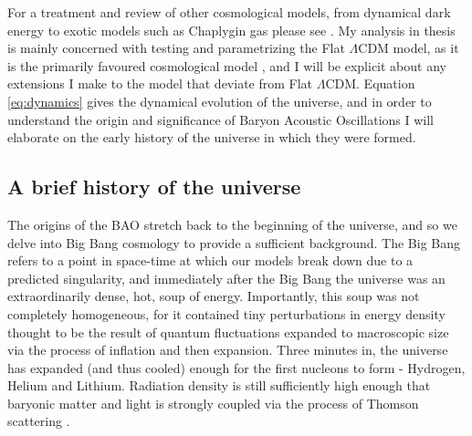 \documentclass[titlesmallcaps, examinerscopy, copyrightpage]{uqthesis}
\begin{document}
For a treatment and review of other cosmological models, from dynamical dark energy \citep{PeeblesRatra1988} to exotic models such as Chaplygin gas \citep{BentoBertolami2003, Benaoum2012} please see \citet{PeeblesRatra2003,DavisMortsell2007, FriemanTurnerHuterer2008, GottSlepian2011}. My analysis in thesis is mainly concerned with testing and parametrizing the Flat $\Lambda$CDM model, as it is the primarily favoured cosmological model \citep{Planck201416, SanchezKazinBeutler2013}, and I will be explicit about any extensions I make to the model that deviate from Flat $\Lambda$CDM. Equation \eqref{eq:dynamics} gives the dynamical evolution of the universe, and in order to understand the origin and significance of Baryon Acoustic Oscillations I will elaborate on the early history of the universe in which they were formed.\\



\subsection{A brief history of the universe}

The origins of the BAO stretch back to the beginning of the universe, and so we delve into Big Bang cosmology to provide a sufficient background. The Big Bang refers to a point in space-time at which our models break down due to a predicted singularity, and immediately after the Big Bang the universe was an extraordinarily dense, hot, soup of energy. Importantly, this soup was not completely homogeneous, for it contained tiny perturbations in energy density thought to be the result of quantum fluctuations expanded to macroscopic size via the process of inflation and then expansion. Three minutes in, the universe has expanded (and thus cooled) enough for the first nucleons to form - Hydrogen, Helium and Lithium. Radiation density is still sufficiently high enough that baryonic matter and light is strongly coupled via the process of Thomson scattering \citep{PeeblesYu1970, Doroshkevich1978, SunyaevZeldovich1970}.
\end{document}
